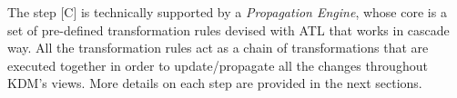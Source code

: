 The step [C] is technically supported by a \textit{Propagation Engine}, whose core is a set of pre-defined transformation rules devised with ATL that works in cascade way. All the transformation rules act as a chain of transformations that are executed together in order to update/propagate all the changes throughout KDM's views. More details on each step are provided in the next sections.







